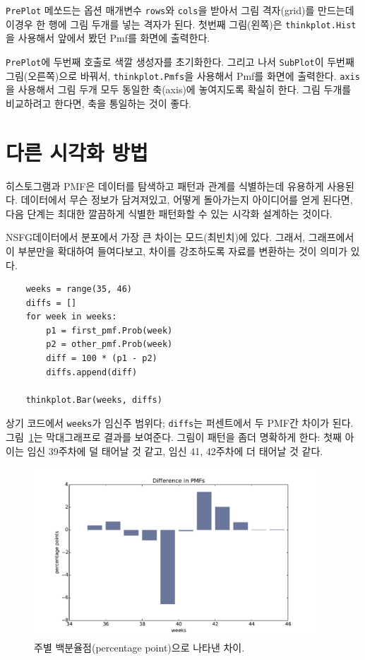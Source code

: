 {\tt PrePlot} 메쏘드는 옵션 매개변수 {\tt rows}와 {\tt cols}을 받아서 
그림 격자(grid)를 만드는데 이경우 한 행에 그림 두개를 넣는 격자가 된다.
첫번째 그림(왼쪽)은 {\tt thinkplot.Hist}을 사용해서 앞에서 봤던 Pmf를 화면에 출력한다. 


{\tt PrePlot}에 두번째 호출로 색깔 생성자를 초기화한다. 그리고 나서 
{\tt SubPlot}이 두번째 그림(오른쪽)으로 바꿔서, {\tt thinkplot.Pmfs}을 사용해서 Pmf를 화면에 출력한다.
{\tt axis}을 사용해서 그림 두개 모두 동일한 축(axis)에 놓여지도록 확실히 한다.
그림 두개를 비교하려고 한다면, 축을 통일하는 것이 좋다.


\section{다른 시각화 방법}
\label{visualization}

히스토그램과 PMF은 데이터를 탐색하고 패턴과 관계를 식별하는데 유용하게 사용된다. 데이터에서 무슨 정보가 담겨져있고, 어떻게 돌아가는지 아이디어를 얻게 된다면, 다음 단계는 최대한 깔끔하게 식별한 패턴화할 수 있는 시각화 설계하는 것이다. 


NSFG데이터에서 분포에서 가장 큰 차이는 모드(최빈치)에 있다. 그래서, 그래프에서 이 부분만을 확대하여 들여다보고, 차이를 강조하도록 자료를 변환하는 것이 의미가 있다.


\begin{verbatim}
    weeks = range(35, 46)
    diffs = []
    for week in weeks:
        p1 = first_pmf.Prob(week)
        p2 = other_pmf.Prob(week)
        diff = 100 * (p1 - p2)
        diffs.append(diff)

    thinkplot.Bar(weeks, diffs)
\end{verbatim}

상기 코드에서 {\tt weeks}가 임신주 범위다; {\tt diffs}는 퍼센트에서 두 PMF간 차이가 된다.  
그림~\ref{probability_nsfg_diffs}는 막대그래프로 결과를 보여준다.
그림이 패턴을 좀더 명확하게 한다: 첫째 아이는 임신 39주차에 덜 태어날 것 같고, 임신 41, 42주차에 더 태어날 것 같다.

\begin{figure}
\centerline{\includegraphics[height=2.5in]{figs/probability_nsfg_diffs.pdf}}
\caption{주별 백분율점(percentage point)으로 나타낸 차이.}
\label{probability_nsfg_diffs}
\end{figure}


